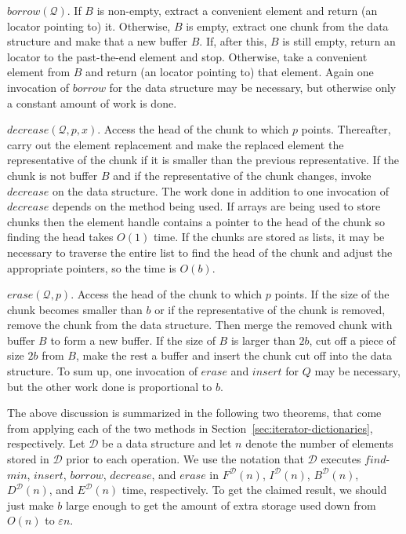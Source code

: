 \documentclass{DIKU-article}
\newcommand{\secref}[1]{\mbox{Section~\ref{sec:#1}}}
\newcommand{\Findmin}{\mbox{$\mathit{find}$}\textnormal{-}\allowbreak{}\mbox{$\mathit{min}$}}
\newcommand{\Insert}{\mbox{$\mathit{insert}$}}
\newcommand{\Erase}{\mbox{$\mathit{erase}$}}
\newcommand{\Decrease}{\mbox{$\mathit{decrease}$}}
\newcommand{\Borrow}{\mbox{$\mathit{borrow}$}}
\begin{document}
\Borrow{}$(\mathcal{Q})$. If $B$ is non-empty, extract a convenient
element and return (an locator pointing to) it.  Otherwise, $B$ is
empty, extract one chunk from the data structure and make that a new
buffer $B$. If, after this, $B$ is still empty, return an locator to
the past-the-end element and stop.  Otherwise, take a convenient
element from $B$ and return (an locator pointing to) that element.
Again one invocation of \Borrow{} for the data structure may be
necessary, but otherwise only a constant amount of work is done.

\Decrease{}$(\mathcal{Q}, p, x)$. Access the head of the chunk to
which $p$ points. Thereafter, carry out the element replacement and
make the replaced element the representative of the chunk if it is
smaller than the previous representative. If the chunk is not buffer
$B$ and if the representative of the chunk changes, invoke \Decrease{}
on the data structure. The work done in addition to one invocation of
\Decrease{} depends on the method being used.  If arrays are being
used to store chunks then the element handle contains a pointer to the
head of the chunk so finding the head takes $O(1)$ time.  If the
chunks are stored as lists, it may be necessary to traverse the entire
list to find the head of the chunk and adjust the appropriate
pointers, so the time is $O(b)$.

\Erase{}$(\mathcal{Q}, p)$. Access the head of the chunk to which
$p$ points. If the size of the chunk becomes smaller than $b$ or if
the representative of the chunk is removed, remove the chunk from the
data structure. Then merge the removed chunk with buffer $B$ to form a
new buffer. If the size of $B$ is larger than $2b$, cut off a piece of
size $2b$ from $B$, make the rest a buffer and insert the chunk cut
off into the data structure. To sum up, one invocation of \Erase{}
and \Insert{} for $Q$ may be necessary, but the other work done is
proportional to $b$.

The above discussion is summarized in the following two theorems, that
come from applying each of the two methods in
\secref{iterator-dictionaries}, respectively.  Let
$\mathcal{D}$ be a data structure and let $n$ denote the number of
elements stored in $\mathcal{D}$ prior to each operation.  We use the
notation that $\mathcal{D}$ executes \Findmin{}, \Insert{},
\Borrow{}, \Decrease{}, and \Erase{} in 
$F^{\mathcal{D}}(n)$,
$I^{\mathcal{D}}(n)$, 
$B^{\mathcal{D}}(n)$, 
$D^{\mathcal{D}}(n)$, and
$E^{\mathcal{D}}(n)$ time, respectively. To get the claimed result, we
should just make $b$ large enough to get the amount of extra storage
used down from $O(n)$ to $\varepsilon n$.
\end{document}
